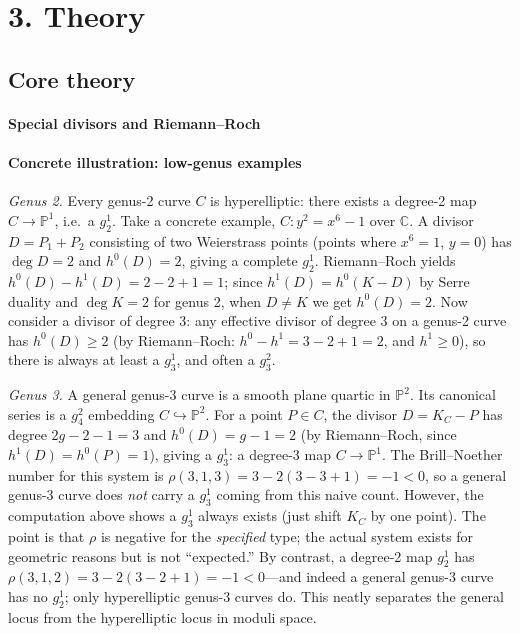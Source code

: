 \section*{3. Theory}
\subsection*{Core theory}
\paragraph{Special divisors and Riemann--Roch}

\paragraph{Concrete illustration: low-genus examples}
\emph{Genus 2.} Every genus-2 curve $C$ is hyperelliptic: there exists a degree-2 map $C\to\mathbb P^1$, i.e.\ a $g^1_2$. Take a concrete example, $C\colon y^2=x^6-1$ over $\mathbb C$. A divisor $D=P_1+P_2$ consisting of two Weierstrass points (points where $x^6=1$, $y=0$) has $\deg D=2$ and $h^0(D)=2$, giving a complete $g^1_2$. Riemann--Roch yields $h^0(D)-h^1(D)=2-2+1=1$; since $h^1(D)=h^0(K-D)$ by Serre duality and $\deg K=2$ for genus 2, when $D\ne K$ we get $h^0(D)=2$. Now consider a divisor of degree 3: any effective divisor of degree 3 on a genus-2 curve has $h^0(D)\ge 2$ (by Riemann--Roch: $h^0-h^1=3-2+1=2$, and $h^1\ge 0$), so there is always at least a $g^1_3$, and often a $g^2_3$.

\emph{Genus 3.} A general genus-3 curve is a smooth plane quartic in $\mathbb P^2$. Its canonical series is a $g^2_4$ embedding $C\hookrightarrow\mathbb P^2$. For a point $P\in C$, the divisor $D=K_C-P$ has degree $2g-2-1=3$ and $h^0(D)=g-1=2$ (by Riemann--Roch, since $h^1(D)=h^0(P)=1$), giving a $g^1_3$: a degree-3 map $C\to\mathbb P^1$. The Brill--Noether number for this system is $\rho(3,1,3)=3-2(3-3+1)=-1<0$, so a general genus-3 curve does \emph{not} carry a $g^1_3$ coming from this naive count. However, the computation above shows a $g^1_3$ always exists (just shift $K_C$ by one point). The point is that $\rho$ is negative for the \emph{specified} type; the actual system exists for geometric reasons but is not ``expected.'' By contrast, a degree-2 map $g^1_2$ has $\rho(3,1,2)=3-2(3-2+1)=-1<0$---and indeed a general genus-3 curve has no $g^1_2$; only hyperelliptic genus-3 curves do. This neatly separates the general locus from the hyperelliptic locus in moduli space.

